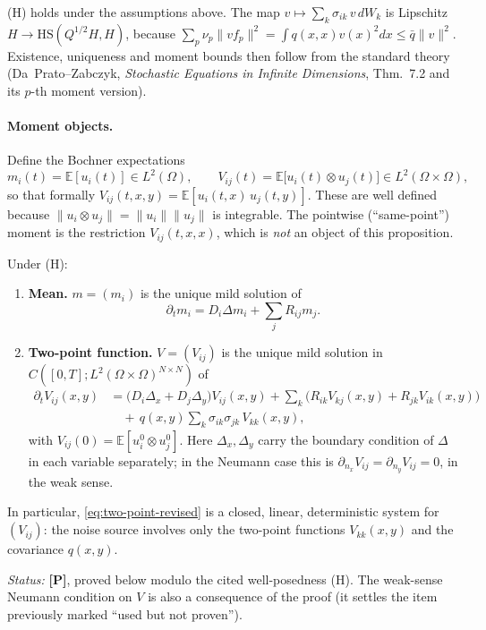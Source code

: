 (H) holds under the assumptions above. The map $v\mapsto \sum_k\sigma_{ik}\,v\,dW_k$ is Lipschitz $H\to \mathrm{HS}(Q^{1/2}H,H)$, because $\sum_p\nu_p\|v f_p\|^2=\int q(x,x)v(x)^2dx\le\bar q\|v\|^2$. Existence, uniqueness and moment bounds then follow from the standard theory (Da~Prato--Zabczyk, \emph{Stochastic Equations in Infinite Dimensions}, Thm.~7.2 and its $p$-th moment version).
 
\paragraph{Moment objects.}
Define the Bochner expectations
\[
m_i(t)=\mathbb{E}[u_i(t)]\in L^2(\Omega),\qquad
V_{ij}(t)=\mathbb{E}\big[u_i(t)\otimes u_j(t)\big]\in L^2(\Omega\times\Omega),
\]
so that formally $V_{ij}(t,x,y)=\mathbb{E}[u_i(t,x)\,u_j(t,y)]$. These are well defined because $\|u_i\otimes u_j\|=\|u_i\|\|u_j\|$ is integrable. The pointwise (``same-point'') moment is the restriction $V_{ij}(t,x,x)$, which is \emph{not} an object of this proposition.
 
\begin{proposition}\label{prop:moments-revised}
Under (H):
\begin{enumerate}
\item[\textup{(a)}] \textbf{Mean.} $m=(m_i)$ is the unique mild solution of
\begin{equation}\label{eq:mean-revised}
\partial_t m_i=D_i\Delta m_i+\sum_j R_{ij}m_j .
\end{equation}
\item[\textup{(b)}] \textbf{Two-point function.} $V=(V_{ij})$ is the unique mild solution in $C([0,T];L^2(\Omega\times\Omega)^{N\times N})$ of
\begin{equation}\label{eq:two-point-revised}
\begin{aligned}
\partial_t V_{ij}(x,y)
&=\big(D_i\Delta_x+D_j\Delta_y\big)V_{ij}(x,y)
+\sum_k\big(R_{ik}V_{kj}(x,y)+R_{jk}V_{ik}(x,y)\big)\\
&\quad+\,q(x,y)\sum_k\sigma_{ik}\sigma_{jk}\,V_{kk}(x,y),
\end{aligned}
\end{equation}
with $V_{ij}(0)=\mathbb{E}[u_i^0\otimes u_j^0]$. Here $\Delta_x,\Delta_y$ carry the boundary condition of $\Delta$ in each variable separately; in the Neumann case this is $\partial_{n_x}V_{ij}=\partial_{n_y}V_{ij}=0$, in the weak sense.
\end{enumerate}
In particular, \eqref{eq:two-point-revised} is a closed, linear, deterministic system for $(V_{ij})$: the noise source involves only the two-point functions $V_{kk}(x,y)$ and the covariance $q(x,y)$.
 
\smallskip
\noindent\emph{Status:} \textbf{[P]}, proved below modulo the cited well-posedness (H). The weak-sense Neumann condition on $V$ is also a consequence of the proof (it settles the item previously marked ``used but not proven'').
\end{proposition}


